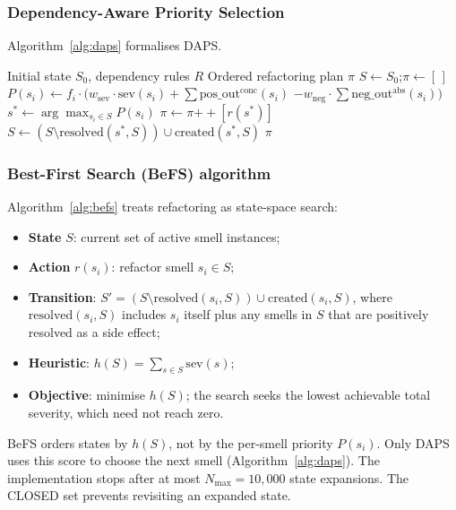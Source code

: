\documentclass[conference]{IEEEtran}
\begin{document}
\subsubsection{Dependency-Aware Priority Selection}
Algorithm~\ref{alg:daps} formalises DAPS.

\begin{algorithm}[tb]
\caption{Dependency-Aware Priority Selection (DAPS).}
\label{alg:daps}
\begin{algorithmic}[1]
\REQUIRE Initial state $S_0$, dependency rules $R$
\ENSURE Ordered refactoring plan $\pi$
\STATE $S \leftarrow S_0$;\quad $\pi \leftarrow [\,]$
    \STATE $P(s_i) \leftarrow f_i \cdot \bigl( w_{\mathrm{sev}} \cdot \mathrm{sev}(s_i)
             + \sum\mathrm{pos\_out}^{\mathrm{conc}}(s_i)$
    \STATE \hspace{2.6em} $- w_{\mathrm{neg}} \cdot \sum\mathrm{neg\_out}^{\mathrm{abs}}(s_i) \bigr)$
  \ENDFOR
  \STATE $s^* \leftarrow \arg\max_{s_i \in S} P(s_i)$
  \STATE $\pi \leftarrow \pi{+\!\!+}[r(s^*)]$
  \STATE $S \leftarrow (S \setminus \mathrm{resolved}(s^*,S)) \cup \mathrm{created}(s^*,S)$
\ENDWHILE
\RETURN $\pi$
\end{algorithmic}
\end{algorithm}

\subsubsection{Best-First Search (BeFS) algorithm}
Algorithm~\ref{alg:befs} treats refactoring as state-space search:
\begin{itemize}
  \item \textbf{State} $S$: current set of active smell instances;
  \item \textbf{Action} $r(s_i)$: refactor smell $s_i \in S$;
  \item \textbf{Transition}:
        $S' = (S \setminus \mathrm{resolved}(s_i, S))
               \cup \mathrm{created}(s_i, S)$,
        where $\mathrm{resolved}(s_i, S)$ includes $s_i$ itself plus any
        smells in $S$ that are positively resolved as a side effect;
  \item \textbf{Heuristic}: $h(S) = \sum_{s \in S} \mathrm{sev}(s)$;
  \item \textbf{Objective}: minimise $h(S)$; the search seeks the lowest
        achievable total severity, which need not reach zero.
\end{itemize}
BeFS orders states by $h(S)$, not by the per-smell priority $P(s_i)$. Only DAPS
uses this score to choose the next smell (Algorithm~\ref{alg:daps}).
The implementation stops after at most $N_{\max}{=}10{,}000$ state expansions.
The CLOSED set prevents revisiting an expanded state.
\end{document}
